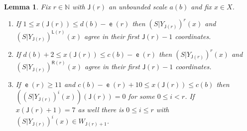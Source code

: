\documentclass[10pt]{amsart}
\newtheorem{lemm}[theo]{Lemma}\newtheorem{prop}[theo]{Proposition}\newtheorem{coro}[theo]{Corollary}\newtheorem{conj}[theo]{Conjecture}
\theoremstyle{definition}\newtheorem{defi}[theo]{Definition}\newtheorem{rema}[theo]{Remark}\newtheorem{exam}[theo]{Example}\newtheorem{exem}[theo]{Example}\newtheorem{nota}[theo]{Notation}
\DeclareMathOperator{\lst}{\mathsf{e}}
\newcommand{\N}{\mathbb{N}}
\newcommand{\lft}{\mathsf{L}}
\newcommand{\rht}{\mathsf{R}}
\newcommand{\scl}{\mathsf{J}}
\begin{document}
\begin{lemm}\label{lem:reduction positive}
Fix $r \in \N$ with $\scl(r)$ an unbounded scale $a(b)$ and fix $x \in X$.
\begin{enumerate}
\item\label{lem:pos red S left}
If $1 \le x(\scl(r)) \le d(b) - \lst(r)$ then $(S|Y_{\scl(r)})^r(x)$ and $(S|Y_{\scl(r)})^{\lft(r)}(x)$ agree in their first $\scl(r)-1$ coordinates.
\item\label{lem:pos red S right}
If $d(b) + 2 \le x(\scl(r)) \le c(b) - \lst(r)$ then $(S|Y_{\scl(r)})^r(x)$ and $(S|Y_{\scl(r)})^{\rht(r)}(x)$ agree in their first $\scl(r)-1$ coordinates.
\item\label{lem:pos red S bdd}
If $\lst(r) \ge 11$ and $c(b) - \lst(r) + 10 \le x(\scl(r)) \le c(b)$ then $((S|Y_{\scl(r)})^i (x))(\scl(r)) = 0$ for some $0 \le i < r$. If $x(\scl(r)+1) = 7$ as well there is $0 \le i \le r$ with $(S|Y_{\scl(r)})^i(x) \in W_{\scl(r)+1}$.
\end{enumerate}
\end{lemm}
\end{document}
